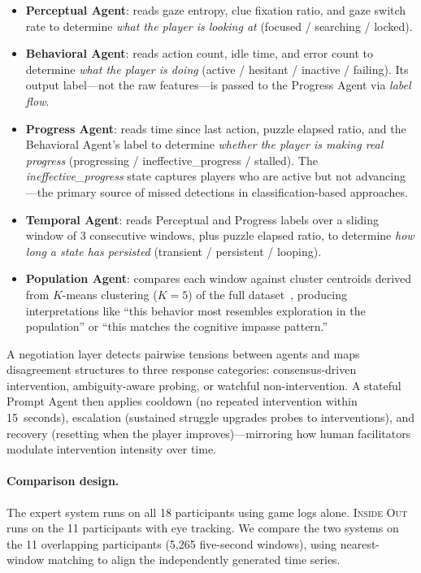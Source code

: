 \begin{itemize}
    \item \textbf{Perceptual Agent}: reads gaze entropy, clue fixation ratio, and gaze switch rate to determine \emph{what the player is looking at} (focused / searching / locked).
    \item \textbf{Behavioral Agent}: reads action count, idle time, and error count to determine \emph{what the player is doing} (active / hesitant / inactive / failing). Its output label---not the raw features---is passed to the Progress Agent via \emph{label flow}.
    \item \textbf{Progress Agent}: reads time since last action, puzzle elapsed ratio, and the Behavioral Agent's label to determine \emph{whether the player is making real progress} (progressing / ineffective\_progress / stalled). The \emph{ineffective\_progress} state captures players who are active but not advancing---the primary source of missed detections in classification-based approaches.
    \item \textbf{Temporal Agent}: reads Perceptual and Progress labels over a sliding window of 3 consecutive windows, plus puzzle elapsed ratio, to determine \emph{how long a state has persisted} (transient / persistent / looping).
    \item \textbf{Population Agent}: compares each window against cluster centroids derived from $K$-means clustering ($K=5$) of the full dataset~\cite{dmello2014confusion, bosch2017affective}, producing interpretations like ``this behavior most resembles exploration in the population'' or ``this matches the cognitive impasse pattern.''
\end{itemize}

A negotiation layer detects pairwise tensions between agents and maps disagreement structures to three response categories: consensus-driven intervention, ambiguity-aware probing, or watchful non-intervention. A stateful Prompt Agent then applies cooldown (no repeated intervention within 15~seconds), escalation (sustained struggle upgrades probes to interventions), and recovery (resetting when the player improves)---mirroring how human facilitators modulate intervention intensity over time.

\paragraph{Comparison design.} The expert system runs on all 18 participants using game logs alone. \textsc{Inside Out} runs on the 11 participants with eye tracking. We compare the two systems on the 11 overlapping participants (5,265 five-second windows), using nearest-window matching to align the independently generated time series.

